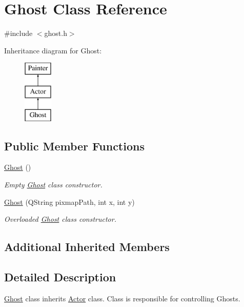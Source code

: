 \hypertarget{class_ghost}{}\section{Ghost Class Reference}
\label{class_ghost}


{\ttfamily \#include $<$ghost.\+h$>$}

Inheritance diagram for Ghost\+:\begin{figure}[H]
\begin{center}
\leavevmode
\includegraphics[height=3.000000cm]{class_ghost}
\end{center}
\end{figure}
\subsection*{Public Member Functions}
\begin{DoxyCompactItemize}
\item 
\mbox{\hyperlink{class_ghost_a2e38d3c0c8546cceb74777b49a8e3bb7}{Ghost}} ()
\begin{DoxyCompactList}\small\item\em Empty \mbox{\hyperlink{class_ghost}{Ghost}} class constructor. \end{DoxyCompactList}\item 
\mbox{\hyperlink{class_ghost_a3b8caf4d2c5a166c05f29e8478abdb4c}{Ghost}} (Q\+String pixmap\+Path, int x, int y)
\begin{DoxyCompactList}\small\item\em Overloaded \mbox{\hyperlink{class_ghost}{Ghost}} class constructor. \end{DoxyCompactList}\end{DoxyCompactItemize}
\subsection*{Additional Inherited Members}


\subsection{Detailed Description}
\mbox{\hyperlink{class_ghost}{Ghost}} class inherits \mbox{\hyperlink{class_actor}{Actor}} class. Class is responsible for controlling Ghosts. 

